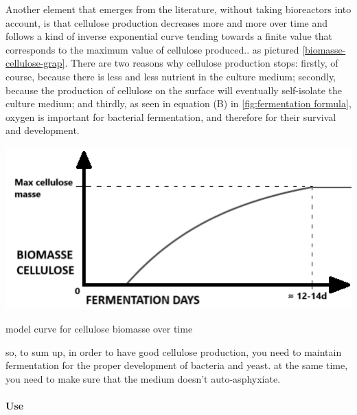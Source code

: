 Another element that emerges from the literature, without taking bioreactors into account, is that cellulose production decreases more and more over time and follows a kind of inverse exponential curve tending towards a finite value that corresponds to the maximum value of cellulose produced.\cite{chong2024modelling}.
as pictured \ref{biomasse-cellulose-grap}. There are two reasons why cellulose production stops: firstly, of course, because there is less and less nutrient in the culture medium; secondly, because the production of cellulose on the surface will eventually self-isolate the culture medium; and thirdly, as seen in equation (B) in \ref{fig:fermentation formula}, oxygen is important for bacterial fermentation, and therefore for their survival and development. 
\begin{marginfigure}
    \centering
    \includegraphics{images/biomasse-cellulose.png}
    \caption{model curve for cellulose biomasse over time}
    \label{fig:biomasse-cellulose-graph}
\end{marginfigure}

so, to sum up, in order to have good cellulose production, you need to maintain fermentation for the proper development of bacteria and yeast. at the same time, you need to make sure that the medium doesn't auto-asphyxiate.



\paragraph[short]{Use}

